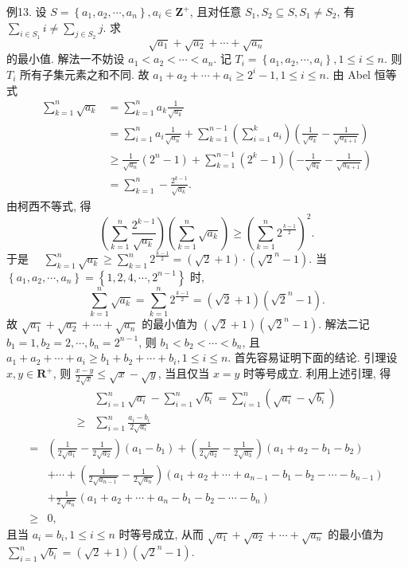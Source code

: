例13. 设 $S=\left\{a_1, a_2, \cdots, a_n\right\}, a_i \in \mathbf{Z}^{+}$, 且对任意 $S_1, S_2 \subseteq S, S_1 \neq S_2$, 有 $\sum_{i \in S_1} i \neq \sum_{j \in S_2} j$. 求
$$
\sqrt{a_1}+\sqrt{a_2}+\cdots+\sqrt{a_n}
$$
的最小值.
解法一不妨设 $a_1<a_2<\cdots<a_n$. 记 $T_i=\left\{a_1, a_2, \cdots, a_i\right\}, 1 \leqslant i \leqslant n$. 则 $T_i$ 所有子集元素之和不同.
故 $a_1+a_2+\cdots+a_i \geqslant 2^i-1,1 \leqslant i \leqslant n$. 由 Abel 恒等式
$$
\begin{aligned}
\sum_{k=1}^n \sqrt{a_k} & =\sum_{k=1}^n a_k \frac{1}{\sqrt{a_k}} \\
& =\sum_{i=1}^n a_i \frac{1}{\sqrt{a_n}}+\sum_{k=1}^{n-1}\left(\sum_{i=1}^k a_i\right)\left(\frac{1}{\sqrt{a_k}}-\frac{1}{\sqrt{a_{k+1}}}\right) \\
& \geqslant \frac{1}{\sqrt{a_n}}\left(2^n-1\right)+\sum_{k=1}^{n-1}\left(2^k-1\right)\left(-\frac{1}{\sqrt{a_k}}-\frac{1}{\sqrt{a_{k+1}}}\right) \\
& =\sum_{k=1}^n-\frac{2^{k-1}}{\sqrt{a_k}} .
\end{aligned}
$$
由柯西不等式, 得
$$
\left(\sum_{k=1}^n \frac{2^{k-1}}{\sqrt{a_k}}\right)\left(\sum_{k=1}^n \sqrt{a_k}\right) \geqslant\left(\sum_{k=1}^n 2^{\frac{k-1}{2}}\right)^2 .
$$
于是 $\quad \sum_{k=1}^n \sqrt{a_k} \geqslant \sum_{k=1}^n 2^{\frac{k-1}{2}}=(\sqrt{2}+1) \cdot\left(\sqrt{2}^n-1\right)$.
当 $\left\{a_1, a_2, \cdots, a_n\right\}=\left\{1,2,4, \cdots, 2^{n-1}\right\}$ 时,
$$
\sum_{k=1}^n \sqrt{a_k}=\sum_{k=1}^n 2^{\frac{k-1}{2}}=(\sqrt{2}+1)\left(\sqrt{2}^n-1\right) .
$$
故 $\sqrt{a_1}+\sqrt{a_2}+\cdots+\sqrt{a_n}$ 的最小值为 $(\sqrt{2}+1)\left(\sqrt{2}^n-1\right)$.
解法二记 $b_1=1, b_2=2, \cdots, b_n=2^{n-1}$, 则 $b_1<b_2<\cdots<b_n$, 且 $a_1+a_2+\cdots+a_i \geqslant b_1+b_2+\cdots+b_i, 1 \leqslant i \leqslant n$.
首先容易证明下面的结论.
引理设 $x, y \in \mathbf{R}^{+}$, 则 $\frac{x-y}{2 \sqrt{x}} \leqslant \sqrt{x}-\sqrt{y}$, 当且仅当 $x=y$ 时等号成立.
利用上述引理, 得
$$
\begin{aligned}
& \sum_{i=1}^n \sqrt{a_i}-\sum_{i=1}^n \sqrt{b_i}=\sum_{i=1}^n\left(\sqrt{a_i}-\sqrt{b_i}\right) \\
\geqslant & \sum_{i=1}^n \frac{a_i-b_i}{2 \sqrt{a_i}}
\end{aligned}
$$
$$
\begin{aligned}
= & \left(\frac{1}{2 \sqrt{a_1}}-\frac{1}{2 \sqrt{a_2}}\right)\left(a_1-b_1\right)+\left(\frac{1}{2 \sqrt{a_2}}-\frac{1}{2 \sqrt{a_3}}\right)\left(a_1+a_2-b_1-b_2\right) \\
& +\cdots+\left(\frac{1}{2 \sqrt{a_{n-1}}}-\frac{1}{2 \sqrt{a_n}}\right)\left(a_1+a_2+\cdots+a_{n-1}-b_1-b_2-\cdots-b_{n-1}\right) \\
& +\frac{1}{2 \sqrt{a_n}}\left(a_1+a_2+\cdots+a_n-b_1-b_2-\cdots-b_n\right) \\
\geqslant & 0,
\end{aligned}
$$
且当 $a_i=b_i, 1 \leqslant i \leqslant n$ 时等号成立, 从而 $\sqrt{a_1}+\sqrt{a_2}+\cdots+\sqrt{a_n}$ 的最小值为 $\sum_{i=1}^n \sqrt{b_i}=(\sqrt{2}+1)\left(\sqrt{2}^n-1\right)$.



